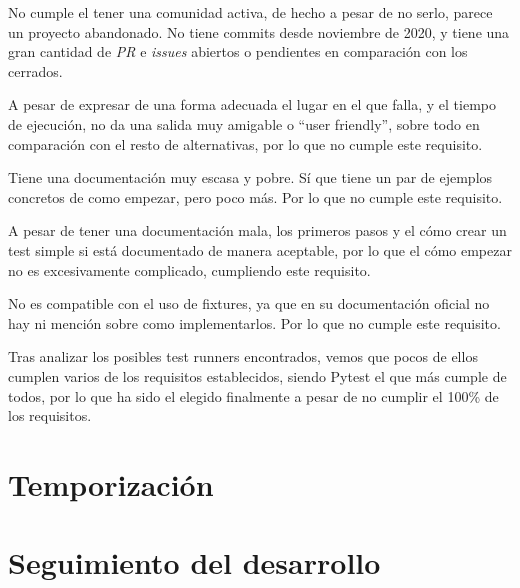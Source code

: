 \begin{todolist}
    \item  No cumple el tener una comunidad activa, de hecho a pesar de no
    serlo, parece un proyecto abandonado. No tiene commits desde noviembre de
    2020, y tiene una gran cantidad de \emph{PR} e \emph{issues} abiertos o
    pendientes en comparación con los cerrados.
    \item A pesar de expresar de una forma adecuada el lugar en el que falla, y
    el tiempo de ejecución, no da una salida muy amigable o ``user friendly'', sobre
    todo en comparación con el resto de alternativas, por lo que no cumple este
    requisito.
    \item Tiene una documentación muy escasa y pobre. Sí que tiene un par de
    ejemplos concretos de como empezar, pero poco más. Por lo que no cumple este
    requisito.
    \item[\xcmark] A pesar de tener una documentación mala, los primeros pasos y
    el cómo crear un test simple si está documentado de manera aceptable, por lo
    que el cómo empezar no es excesivamente complicado, cumpliendo este
    requisito. 
    \item No es compatible con el uso de fixtures, ya que en su documentación
    oficial no hay ni mención sobre como implementarlos. Por lo que no cumple
    este requisito.
\end{todolist}



Tras analizar los posibles test runners encontrados, vemos que pocos de ellos
cumplen varios de los requisitos establecidos, siendo Pytest el que más cumple
de todos, por lo que ha sido el elegido finalmente a pesar de no cumplir el
100\% de los requisitos.


\section{Temporización}

\section{Seguimiento del desarrollo}
